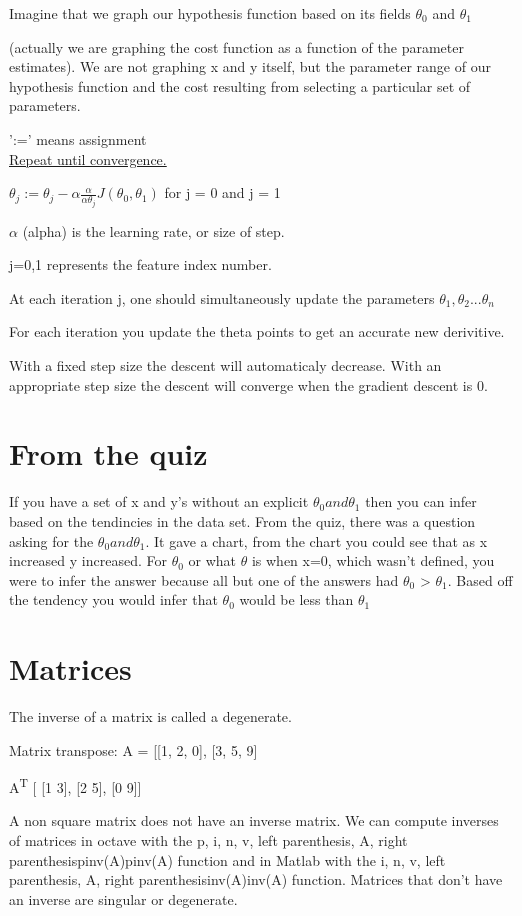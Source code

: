 \documentclass{article}
\begin{document}
    Imagine that we graph our hypothesis function based on its fields $\theta_0$
    and $\theta_1$

    (actually we are graphing the cost function as a function of the
    parameter estimates). We are not graphing x and y itself, but the parameter
    range of our hypothesis function and the cost resulting from selecting a
    particular set of parameters.


    ':=' means assignment\\
    \underline{Repeat until convergence.}

    $\theta_j := \theta_j - \alpha \frac{\alpha}{\alpha\theta_j}J(\theta_0, \theta_1)$
    for j = 0 and j = 1

    $\alpha$ (alpha) is the learning rate, or size of step.

    j=0,1 represents the feature index number.


    At each iteration j, one should simultaneously update the parameters
    $\theta_1, \theta_2 ... \theta_n$


    For each iteration you update the theta points to get an accurate new
    derivitive.

    With a fixed step size the descent will automaticaly decrease.
    With an appropriate step size the descent will converge when the gradient
    descent is 0.



    \section{From the quiz}


    If you have a set of x and y's without an explicit $\theta_0 and \theta_1$
    then you can infer based on the tendincies in the data set.
    From the quiz, there was a question asking for the $
    \theta_0 and \theta_1$. It gave a chart, from the chart you could see that
    as x increased y increased. For $\theta_0$ or what $\theta$ is when x=0,
    which wasn't defined, you were to infer the answer because all but one of
    the answers had $\theta_0$ > $\theta_1$. Based off the tendency you would
    infer that $\theta_0$ would be less than $\theta_1$

    \section{Matrices}
    The inverse of a matrix is called a degenerate.


    Matrix transpose: A = [[1, 2, 0], [3, 5, 9]


    A\textsuperscript{T} [ [1 3], [2 5], [0 9]]

    A non square matrix does not have an inverse matrix. We can compute
    inverses of matrices in octave with the p, i, n, v, left parenthesis, A,
    right parenthesispinv(A)pinv(A) function and in Matlab with the i, n, v,
    left parenthesis, A, right parenthesisinv(A)inv(A) function. Matrices that
    don't have an inverse are singular or degenerate.
\end{document}
